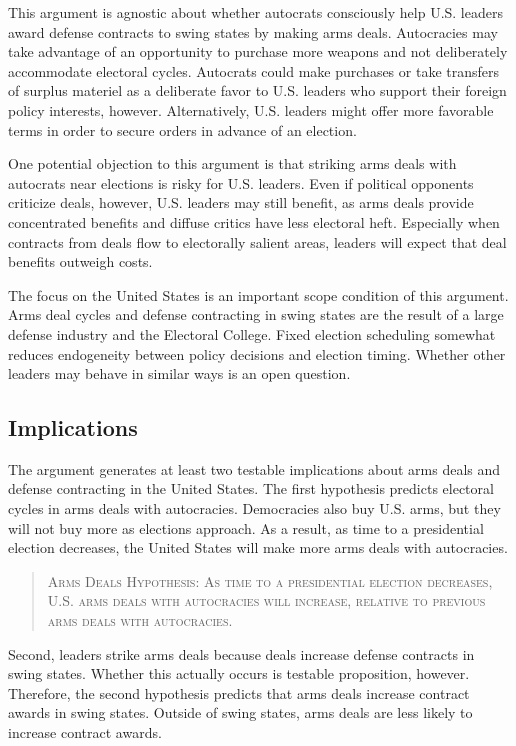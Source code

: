 \documentclass[12pt]{article}
\begin{document}
This argument is agnostic about whether autocrats consciously help U.S. leaders award defense contracts to swing states by making arms deals.
Autocracies may take advantage of an opportunity to purchase more weapons and not deliberately accommodate electoral cycles. 
Autocrats could make purchases or take transfers of surplus materiel as a deliberate favor to U.S. leaders who support their foreign policy interests, however. 
Alternatively, U.S. leaders might offer more favorable terms in order to secure orders in advance of an election.


One potential objection to this argument is that striking arms deals with autocrats near elections is risky for U.S. leaders. 
Even if political opponents criticize deals, however, U.S. leaders may still benefit, as arms deals provide concentrated benefits and diffuse critics have less electoral heft.
Especially when contracts from deals flow to electorally salient areas, leaders will expect that deal benefits outweigh costs. 


The focus on the United States is an important scope condition of this argument.
Arms deal cycles and defense contracting in swing states are the result of a large defense industry and the Electoral College. 
Fixed election scheduling somewhat reduces endogeneity between policy decisions and election timing. 
Whether other leaders may behave in similar ways is an open question. 



\subsection{Implications}


The argument generates at least two testable implications about arms deals and defense contracting in the United States. 
The first hypothesis predicts electoral cycles in arms deals with autocracies.
Democracies also buy U.S. arms, but they will not buy more as elections approach. 
As a result, as time to a presidential election decreases, the United States will make more arms deals with autocracies. 


\begin{quote}
\textsc{Arms Deals Hypothesis: As time to a presidential election decreases, U.S. arms deals with autocracies will increase, relative to previous arms deals with autocracies.}
\end{quote}


Second, leaders strike arms deals because deals increase defense contracts in swing states.
Whether this actually occurs is testable proposition, however. 
Therefore, the second hypothesis predicts that arms deals increase contract awards in swing states.
Outside of swing states, arms deals are less likely to increase contract awards. 
\end{document}
